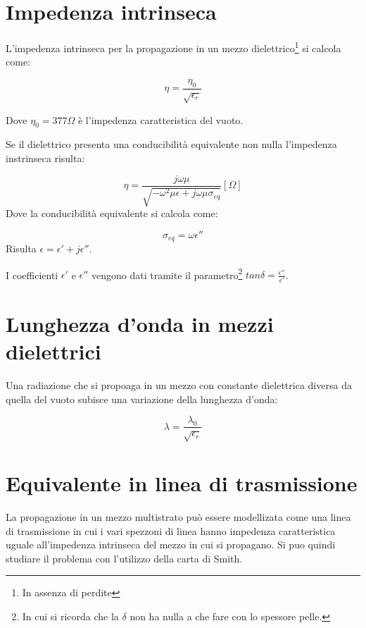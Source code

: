 \documentclass[10pt,a4paper]{report}
\begin{document}
	\section{Impedenza intrinseca}

		L'impedenza intrinseca per la propagazione in un mezzo dielettrico\footnote{In assenza di perdite} si calcola come:

		\begin{equation}
		\eta=\frac{\eta_0}{\sqrt{\epsilon_r}}
		\end{equation}

		Dove $\eta_0=377\Omega$ è l'impedenza caratteristica del vuoto.

		Se il dielettrico presenta una conducibilità equivalente non nulla l'impedenza instrinseca risulta:

		\begin{equation}
		\eta=\frac{j\omega\mu}{\sqrt{-\omega^2\mu\epsilon+j\omega\mu\sigma_{eq}}} [  \Omega  ]
		\end{equation}
		Dove la conducibilità equivalente si calcola come:

		\begin{equation}
		\sigma_{eq}=\omega \epsilon''
		\end{equation}
		Risulta $\epsilon=\epsilon'+j\epsilon''$.
		
		I coefficienti $\epsilon'$ e $\epsilon''$ vengono dati tramite il parametro\footnote{In cui si ricorda che la $\delta$ non ha nulla a che fare con lo spessore pelle.} $tan\delta=\frac{\epsilon''}{\epsilon'}$.

	\section{Lunghezza d'onda in mezzi dielettrici}
		Una radiazione che si propoaga in un mezzo con constante dielettrica diversa da quella del vuoto subisce una variazione della lunghezza d'onda:

		\begin{equation} 
		\lambda = \frac {\lambda_0} {\sqrt {\epsilon_r} }
		\end{equation} 

	\section{Equivalente in linea di trasmissione}

		
		La propagazione in un mezzo multistrato può essere modellizata come una linea di trasmissione in cui i vari spezzoni di linea hanno impedenza caratteristica uguale all'impedenza intrinseca del mezzo in cui si propagano.	
		Si puo quindi studiare il problema con l'utilizzo della carta di Smith.
\end{document}
